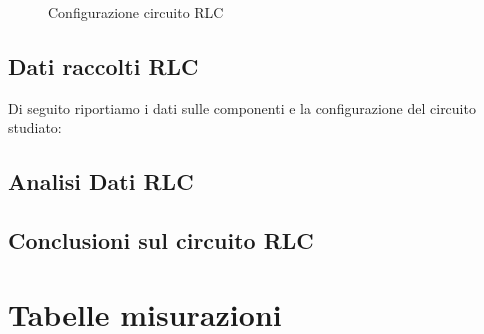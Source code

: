 \documentclass[letterpaper,12pt]{article}
\begin{document}
\begin{figure}[h!]
	\centering
	\caption{Configurazione circuito RLC}
	\label{fig:configRLC}
\end{figure}



\subsection{Dati raccolti RLC}
Di seguito riportiamo i dati sulle componenti e la configurazione del circuito studiato:

\newpage
\subsection{Analisi Dati RLC}

\newpage
\subsection{Conclusioni sul circuito RLC}


\newpage
\section{Tabelle misurazioni}
\end{document}
